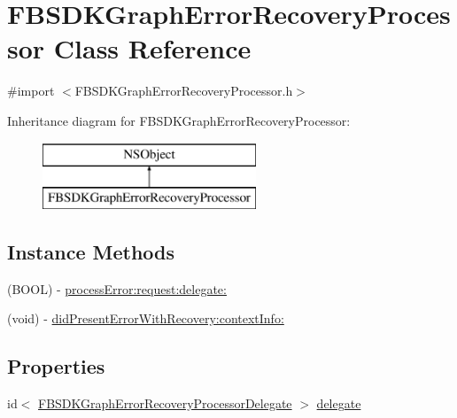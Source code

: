 \hypertarget{interface_f_b_s_d_k_graph_error_recovery_processor}{}\section{F\+B\+S\+D\+K\+Graph\+Error\+Recovery\+Processor Class Reference}
\label{interface_f_b_s_d_k_graph_error_recovery_processor}


{\ttfamily \#import $<$F\+B\+S\+D\+K\+Graph\+Error\+Recovery\+Processor.\+h$>$}

Inheritance diagram for F\+B\+S\+D\+K\+Graph\+Error\+Recovery\+Processor\+:\begin{figure}[H]
\begin{center}
\leavevmode
\includegraphics[height=2.000000cm]{interface_f_b_s_d_k_graph_error_recovery_processor}
\end{center}
\end{figure}
\subsection*{Instance Methods}
\begin{DoxyCompactItemize}
\item 
(B\+O\+O\+L) -\/ \hyperlink{interface_f_b_s_d_k_graph_error_recovery_processor_a0073720d8165a9ec12647d370248e343}{process\+Error\+:request\+:delegate\+:}
\item 
(void) -\/ \hyperlink{interface_f_b_s_d_k_graph_error_recovery_processor_a2b4fe67a50c150f8b5fc0e664d92c552}{did\+Present\+Error\+With\+Recovery\+:context\+Info\+:}
\end{DoxyCompactItemize}
\subsection*{Properties}
\begin{DoxyCompactItemize}
\item 
id$<$ \hyperlink{protocol_f_b_s_d_k_graph_error_recovery_processor_delegate-p}{F\+B\+S\+D\+K\+Graph\+Error\+Recovery\+Processor\+Delegate} $>$ \hyperlink{interface_f_b_s_d_k_graph_error_recovery_processor_a3028da88a3e241fed8b263d99c207092}{delegate}
\end{DoxyCompactItemize}


